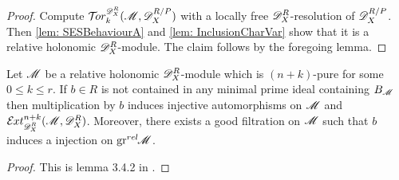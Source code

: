 \begin{proof}
  Compute $\Tr{\D_X^R}{k}(\M, \D_X^{R/P})$ with a locally free $\mathscr{D}_X^R$-resolution of $\mathscr{D}_X^{R/P}$.
  Then \cref{lem: SESBehaviourA} and \cref{lem: InclusionCharVar} show that it is a relative holonomic $\mathscr{D}_X^R$-module.
  The claim follows by the foregoing lemma.
\end{proof}
\begin{lemma}\label{lem: NotBernsteinInjectiveAutomorphism}
  Let $\mathscr{M}$ be a relative holonomic $\mathscr{D}_X^R$-module which is $(n+k)$-pure for some $0\leq k \leq r$. If $b\in R$ is not contained in any minimal prime ideal containing $B_{\mathscr{M}}$ then multiplication by $b$ induces injective automorphisms on $\mathscr{M}$ and $\Ex{\D_X^R}{n+k}(\M,\D_X^R)$. Moreover, there exists a good filtration on $\mathscr{M}$ such that $b$ induces a injection on $\operatorname{gr}^{rel}\mkern-5mu \mathscr{M}$.
\end{lemma}
\begin{proof}
  This is lemma 3.4.2 in \cite{budur2019zero}.
\end{proof}
